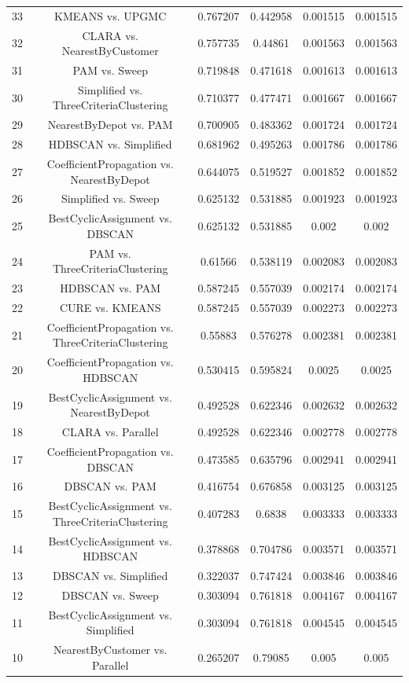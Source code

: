 \documentclass[a4paper,10pt]{article}
\begin{document}
\begin{landscape}
\begin{table}[!htp]
\begin{tabular}{cccccc}
33&KMEANS vs. UPGMC&0.767207&0.442958&0.001515&0.001515\\
32&CLARA vs. NearestByCustomer&0.757735&0.44861&0.001563&0.001563\\
31&PAM vs. Sweep&0.719848&0.471618&0.001613&0.001613\\
30&Simplified vs. ThreeCriteriaClustering&0.710377&0.477471&0.001667&0.001667\\
29&NearestByDepot vs. PAM&0.700905&0.483362&0.001724&0.001724\\
28&HDBSCAN vs. Simplified&0.681962&0.495263&0.001786&0.001786\\
27&CoefficientPropagation vs. NearestByDepot&0.644075&0.519527&0.001852&0.001852\\
26&Simplified vs. Sweep&0.625132&0.531885&0.001923&0.001923\\
25&BestCyclicAssignment vs. DBSCAN&0.625132&0.531885&0.002&0.002\\
24&PAM vs. ThreeCriteriaClustering&0.61566&0.538119&0.002083&0.002083\\
23&HDBSCAN vs. PAM&0.587245&0.557039&0.002174&0.002174\\
22&CURE vs. KMEANS&0.587245&0.557039&0.002273&0.002273\\
21&CoefficientPropagation vs. ThreeCriteriaClustering&0.55883&0.576278&0.002381&0.002381\\
20&CoefficientPropagation vs. HDBSCAN&0.530415&0.595824&0.0025&0.0025\\
19&BestCyclicAssignment vs. NearestByDepot&0.492528&0.622346&0.002632&0.002632\\
18&CLARA vs. Parallel&0.492528&0.622346&0.002778&0.002778\\
17&CoefficientPropagation vs. DBSCAN&0.473585&0.635796&0.002941&0.002941\\
16&DBSCAN vs. PAM&0.416754&0.676858&0.003125&0.003125\\
15&BestCyclicAssignment vs. ThreeCriteriaClustering&0.407283&0.6838&0.003333&0.003333\\
14&BestCyclicAssignment vs. HDBSCAN&0.378868&0.704786&0.003571&0.003571\\
13&DBSCAN vs. Simplified&0.322037&0.747424&0.003846&0.003846\\
12&DBSCAN vs. Sweep&0.303094&0.761818&0.004167&0.004167\\
11&BestCyclicAssignment vs. Simplified&0.303094&0.761818&0.004545&0.004545\\
10&NearestByCustomer vs. Parallel&0.265207&0.79085&0.005&0.005\\

\end{tabular}
\end{table}
\end{landscape}
\end{document}

